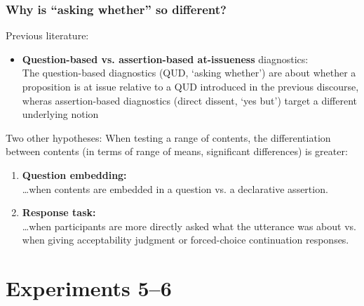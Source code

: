 \documentclass[compress, xcolor = dvipsnames, aspectratio=169]{beamer}
\begin{document}
	\begin{frame}[t]\frametitle{Why is \enquote{asking whether} so different?}\small 
		Previous literature:
		\begin{itemize}
			\item \textbf{Question-based vs. assertion-based at-issueness} diagnostics:\\
				The question-based diagnostics (QUD, `asking whether') are about whether a proposition is at issue relative to a QUD introduced in the previous discourse, wheras assertion-based diagnostics (direct dissent, `yes but') target a different underlying notion

		\end{itemize}\pause
		\vfill 

		Two other hypotheses: When testing a range of contents, the differentiation between contents (in terms of range of means, significant differences) is greater:
		\begin{enumerate}
			\item \textbf{Question embedding:} \\ 
				\dots when contents are embedded in a question vs. a declarative assertion.\pause
				
			\item \textbf{Response task:} \\ \dots when participants are more directly asked what the utterance was about vs. when giving acceptability judgment or forced-choice continuation responses.
			
		\end{enumerate}

	\end{frame}

\section{Experiments 5–6}
\end{document}
